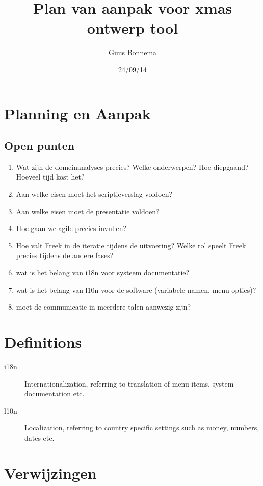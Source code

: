 \documentclass[a4paper,11pt,twoside,draft]{article}
\author{Guus Bonnema}
\date{24/09/14}
\title{Plan van aanpak voor xmas ontwerp tool}
\begin{document}




\section{Planning en Aanpak}





\subsection{Open punten}

\begin{enumerate}
 \item Wat zijn de domeinanalyses precies? Welke onderwerpen? Hoe diepgaand? Hoeveel tijd kost het?
 \item Aan welke eisen moet het scriptieverslag voldoen?
 \item Aan welke eisen moet de presentatie voldoen?
 \item Hoe gaan we agile precies invullen?
 \item Hoe valt Freek in de iteratie tijdens de uitvoering? Welke rol speelt Freek precies tijdens de andere fases?
 \item wat is het belang van i18n voor systeem documentatie?
 \item wat is het belang van l10n voor de software (variabele namen, menu opties)?
 \item moet de communicatie in meerdere talen aanwezig zijn?
\end{enumerate}


\appendix
\section{Definitions}

\begin{description}
 \item[i18n] Internationalization, referring to translation of menu items, system documentation etc.
 \item[l10n] Localization, referring to country specific settings such as money, numbers, dates etc.
\end{description}
\section{Verwijzingen}


\end{document}
